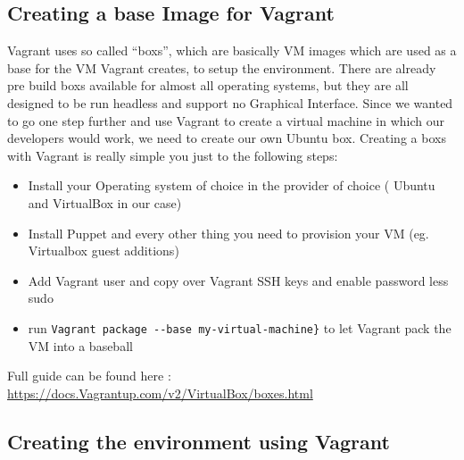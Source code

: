 \subsection{Creating a base Image for Vagrant}
Vagrant uses so called “\glspl{box}”, which are basically \gls{VM} images which are used as a base for the \gls{VM} Vagrant creates, to setup the environment. There are already pre build \glspl{box} available for almost all operating systems, but they are all designed to be run headless and support no Graphical Interface. Since we wanted to go one step further and use Vagrant to create a virtual machine in which our developers would work, we need to create our own Ubuntu \gls{box}. Creating a \glspl{box} with Vagrant is really simple you just to the following steps:
\begin{itemize}
\item Install your Operating system of choice in the \gls{provider} of choice ( Ubuntu and VirtualBox in our case)
\item Install Puppet and every other thing you need to provision your \gls{VM} (eg. Virtual\gls{box} guest additions)
\item Add Vagrant user and copy over Vagrant SSH keys and enable password less sudo
\item run \verb|Vagrant package --base my-virtual-machine}| to let Vagrant pack the \gls{VM} into a baseball
\end{itemize}
Full guide can be found here : \url{https://docs.Vagrantup.com/v2/VirtualBox/boxes.html}



\subsection{Creating the environment using Vagrant}

